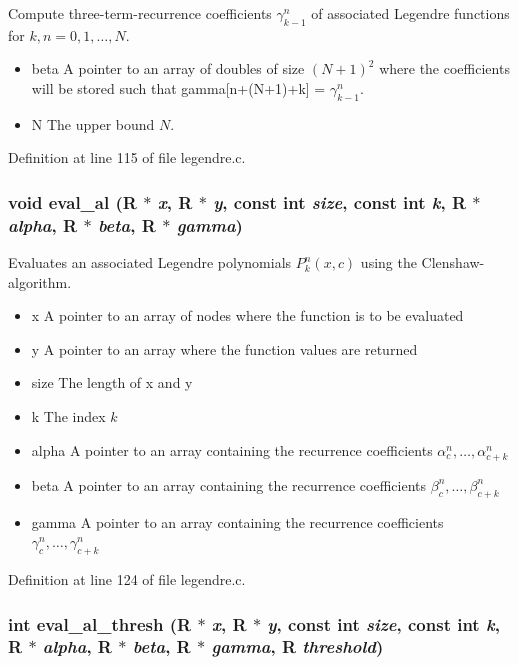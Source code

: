 Compute three-term-recurrence coefficients $\gamma_{k-1}^n$ of associated Legendre functions for $k,n = 0,1,\ldots,N$. 

\begin{itemize}
\item beta A pointer to an array of doubles of size $(N+1)^2$ where the coefficients will be stored such that gamma\mbox{[}n+(N+1)+k\mbox{]} = $\gamma_{k-1}^n$. \item N The upper bound $N$. \end{itemize}


Definition at line 115 of file legendre.c.\hypertarget{group__nfsft_gc5f2f8c36dc4f8ca65f058af6491f163}{
\subsubsection{\setlength{\rightskip}{0pt plus 5cm}void eval\_\-al (R $\ast$ {\em x}, R $\ast$ {\em y}, const int {\em size}, const int {\em k}, R $\ast$ {\em alpha}, R $\ast$ {\em beta}, R $\ast$ {\em gamma})}}
\label{group__nfsft_gc5f2f8c36dc4f8ca65f058af6491f163}


Evaluates an associated Legendre polynomials $P_k^n(x,c)$ using the Clenshaw-algorithm. 

\begin{itemize}
\item x A pointer to an array of nodes where the function is to be evaluated \item y A pointer to an array where the function values are returned \item size The length of x and y \item k The index $k$ \item alpha A pointer to an array containing the recurrence coefficients $\alpha_c^n,\ldots,\alpha_{c+k}^n$ \item beta A pointer to an array containing the recurrence coefficients $\beta_c^n,\ldots,\beta_{c+k}^n$ \item gamma A pointer to an array containing the recurrence coefficients $\gamma_c^n,\ldots,\gamma_{c+k}^n$ \end{itemize}


Definition at line 124 of file legendre.c.\hypertarget{group__nfsft_g1bc5682379de94e87031afa38e02675d}{
\subsubsection{\setlength{\rightskip}{0pt plus 5cm}int eval\_\-al\_\-thresh (R $\ast$ {\em x}, R $\ast$ {\em y}, const int {\em size}, const int {\em k}, R $\ast$ {\em alpha}, R $\ast$ {\em beta}, R $\ast$ {\em gamma}, R {\em threshold})}}
\label{group__nfsft_g1bc5682379de94e87031afa38e02675d}


